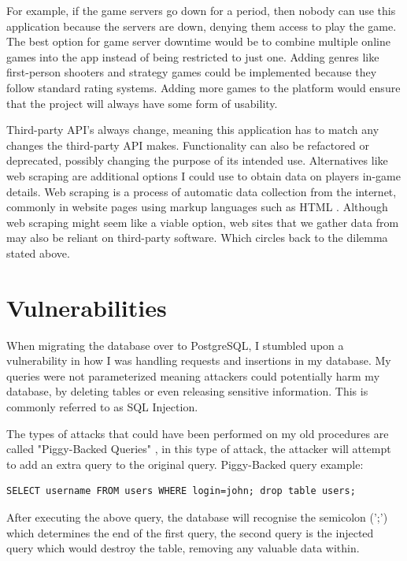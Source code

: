 For example, if the game servers go down for a period, then nobody can use this application because the servers are down, denying them access to play the game. The best option for game server downtime would be to combine multiple online games into the app instead of being restricted to just one. Adding genres like first-person shooters and strategy games could be implemented because they follow standard rating systems. Adding more games to the platform would ensure that the project will always have some form of usability.\hfill \break

Third-party API's always change, meaning this application has to match any changes the third-party API makes. Functionality can also be refactored or deprecated, possibly changing the purpose of its intended use. \hfill \break
Alternatives like web scraping are additional options I could use to obtain data on players in-game details. Web scraping is a process of automatic data collection from the internet, commonly in website pages using markup languages such as HTML \cite{slamet2018web}. Although web scraping might seem like a viable option, web sites that we gather data from may also be reliant on third-party software. Which circles back to the dilemma stated above.
\section{Vulnerabilities}
When migrating the database over to PostgreSQL, I stumbled upon a vulnerability in how I was handling requests and insertions in my database. My queries were not parameterized meaning attackers could potentially harm my database, by deleting tables or even releasing sensitive information. This is commonly referred to as SQL Injection. 

The types of attacks that could have been performed on my old procedures are called "Piggy-Backed Queries" \cite{halfond2006classification}, in this type of attack, the attacker will attempt to add an extra query to the original query. 
\newline Piggy-Backed query example:

\begin{verbatim}
SELECT username FROM users WHERE login=john; drop table users;
\end{verbatim}

After executing the above query, the database will recognise the semicolon (';') which determines the end of the first query, the second query is the injected query which would destroy the table, removing any valuable data within.

